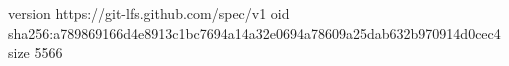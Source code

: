 version https://git-lfs.github.com/spec/v1
oid sha256:a789869166d4e8913c1bc7694a14a32e0694a78609a25dab632b970914d0cec4
size 5566
